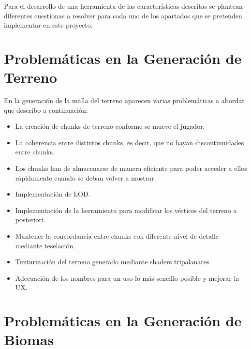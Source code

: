 Para el desarrollo de una herramienta de las características descritas se plantean diferentes cuestionas a resolver para cada uno de los apartados que se pretenden implementar en este proyecto.

\section{Problemáticas en la Generación de Terreno}

En la generación de la malla del terreno aparecen varias problemáticas a abordar que describo a continuación:

\begin{itemize}
    \item La creación de chunks de terreno conforme se mueve el jugador.
    \item La coherencia entre distintos chunks, es decir, que no hayan discontinuidades entre chunks.
    \item Los chunks han de almacenarse de manera eficiente para poder acceder a ellos rápidamente cuando se deban volver a mostrar.
    \item Implementación de LOD.
    \item Implementación de la herramienta para modificar los vértices del terreno a posteriori.
    \item Mantener la concordancia entre chunks con diferente nivel de detalle mediante teselación.
    \item Texturización del terreno generado mediante shaders tripalanares.
    \item Adecuación de los nombres para un uso lo más sencillo posible y mejorar la UX.
\end{itemize}

\section{Problemáticas en la Generación de Biomas}

